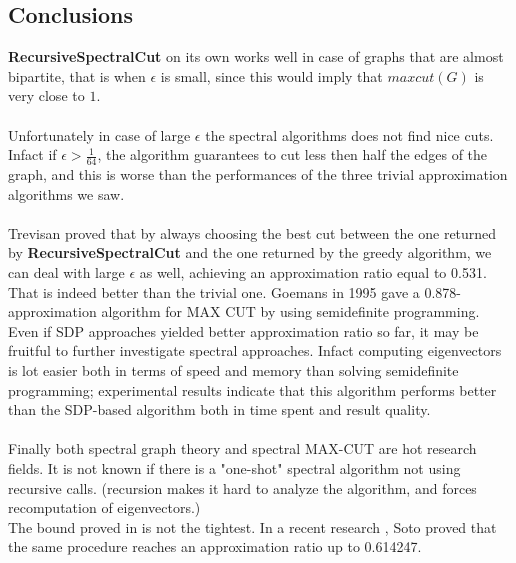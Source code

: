 \subsection{Conclusions}
\textbf{RecursiveSpectralCut} on its own works well in case of graphs that are almost bipartite, that is when $ \epsilon $ is small, since this would imply that $ maxcut(G) $ is very close to $ 1 $.
\\
\\
Unfortunately in case of large $ \epsilon $ the spectral algorithms does not find nice cuts. \\
Infact if $ \epsilon > \frac{1}{64} $, the algorithm guarantees to cut less then half the edges of the graph, and this is worse than the performances of the three trivial approximation algorithms we saw.
\\
\\
Trevisan proved that by always choosing the best cut between the one returned by \textbf{RecursiveSpectralCut} and the one returned by the greedy algorithm, we can deal with large $ \epsilon $ as well, achieving an approximation ratio equal to 0.531. That is indeed better than the trivial one. Goemans\cite{goe} in 1995 gave a 0.878-approximation algorithm for MAX CUT by using semidefinite programming. Even if SDP approaches yielded better approximation ratio so far, it may be fruitful to further investigate spectral approaches. Infact computing eigenvectors is lot easier both in terms of speed and memory than solving semidefinite programming; experimental results indicate that this algorithm performs better than the SDP-based algorithm both in time spent and result quality.
\\
\\
Finally both spectral graph theory and spectral MAX-CUT are hot research fields. It is not known if there is a "one-shot" spectral algorithm not using recursive calls. (recursion makes it hard to analyze the algorithm, and forces recomputation of eigenvectors.)\\
The bound proved in \cite{trevi-1} is not the tightest. In a recent research \cite{soto-improv}, Soto proved that the same procedure reaches an approximation ratio up to 0.614247.
